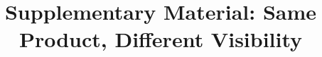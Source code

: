 \documentclass[sigconf,anonymous,nonacm]{acmart}
\title{Supplementary Material: Same Product, Different Visibility}
\begin{document}
\maketitle
\raggedbottom
\appendix
\renewcommand{\thetable}{S\arabic{table}}

\end{document}
